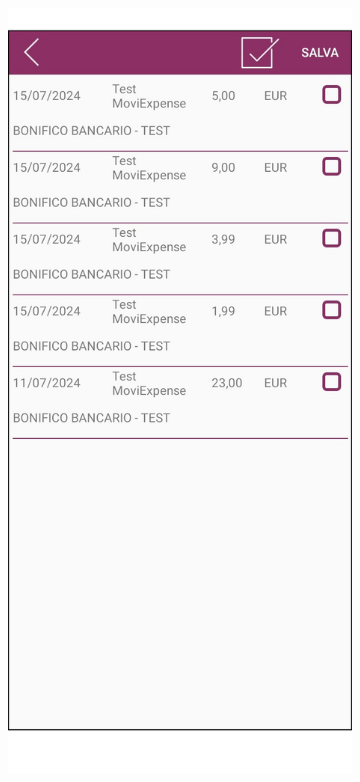 \begin{figure}[H]
    \begin{subfigure}{.5\textwidth}
        \centering
        \includegraphics[width=.7\columnwidth]{images/screenshot/old/addSpese.png}\vspace{2mm}
    \end{subfigure}
    \begin{subfigure}{.5\textwidth}
        \centering

\end{subfigure}
\end{figure}
